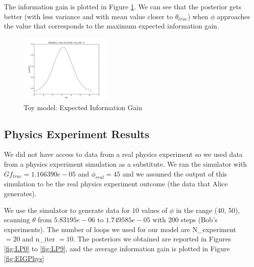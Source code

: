 \documentclass[10pt,journal,compsoc]{IEEEtran}
\begin{document}
\begin{figure}
\end{figure}
The information gain is plotted in Figure \ref{fig:EIGPlot}. We can see that the posterior gets better (with less variance and with mean value closer to $\theta_{true}$) when $\phi$ approaches the value that corresponds to the maximum expected information gain.

\begin{figure}[ht!]
 \centering
  \includegraphics[width=0.4\textwidth]{images/EIG_average.png}
  \caption{\label{fig:EIGPlot} Toy model: Expected Information Gain}
\end{figure}

\subsection{Physics Experiment Results}
We did not have access to data from a real physics experiment so we used data from a physics experiment simulation as a substitute. We ran the simulator with $Gf_{true}=1.166390e-{05}$ and $\phi_{real} = 45$ and we assumed the output of this simulation to be the real physics experiment outcome (the data that Alice generates). 

We use the simulator to generate data for $10$ values of $\phi$ in the range (40, 50), scanning $\theta$ from $5.83195e-{06}$ to $1.749585e-{05}$ with $200$ steps (Bob's experiments). The number of loops we used for our model are N\_experiment$=20$ and n\_iter $= 10$. The posteriors we obtained are reported in Figures \ref{fig:LP0} to \ref{fig:LP9}, and the average information gain is plotted in Figure \ref{fig:EIGPhys}
\end{document}
